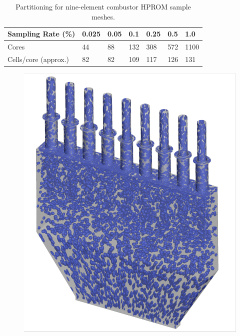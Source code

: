 \begin{table}
	\centering
	\begin{tabular}{ lllllll }
	\toprule
	Sampling Rate (\%) & 0.025 & 0.05 & 0.1 & 0.25 & 0.5 & 1.0 \\
	\midrule
	Cores & 44 & 88 & 132 & 308 & 572 & 1100 \\
	Cells/core (approx.) & 82 & 82 & 109 & 117 & 126 & 131 \\
	\bottomrule
	\end{tabular}
	\caption{\label{tab:nineElemSampProcs}Partitioning for nine-element combustor HPROM sample meshes.}
\end{table}

\begin{figure}
	\begin{minipage}{0.49\linewidth}
		\includegraphics[width=0.99\linewidth,trim={0.3em 0.3em 0.3em 0.3em},clip]{Chapters/HPROMResults/Images/nineElem/deim/iblank/random_iblank_iso.png}
	\end{minipage}
	\begin{minipage}{0.49\linewidth}

\end{minipage}
\end{figure}
